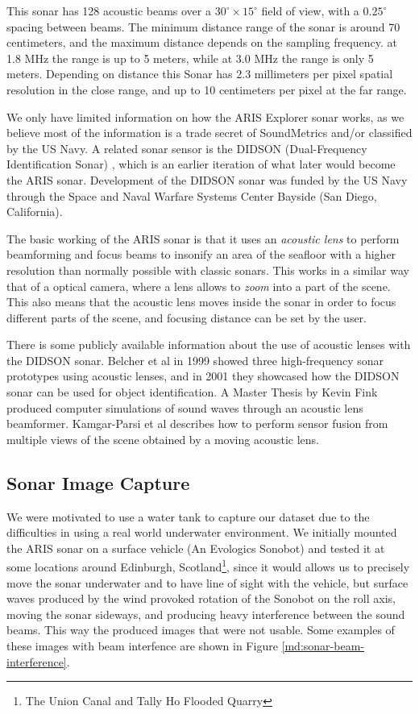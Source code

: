 This sonar has 128 acoustic beams over a $30^\circ \times 15^\circ$ field of view, with a $0.25^\circ$ spacing between beams. The minimum distance range of the sonar is around 70 centimeters, and the maximum distance depends on the sampling frequency. at 1.8 MHz the range is up to 5 meters, while at 3.0 MHz the range is only 5 meters. Depending on distance this Sonar has 2.3 millimeters per pixel spatial resolution in the close range, and up to 10 centimeters per pixel at the far range.

We only have limited information on how the ARIS Explorer sonar works, as we believe most of the information is a trade secret of SoundMetrics and/or classified by the US Navy. A related sonar sensor is the DIDSON (Dual-Frequency Identification Sonar) \cite[-2em]{belcher2002dual}, which is an earlier iteration of what later would become the ARIS sonar. Development of the DIDSON sonar was funded by the US Navy through the Space and Naval Warfare Systems Center Bayside (San Diego, California).

The basic working of the ARIS sonar is that it uses an \textit{acoustic lens} \cite[-2em]{wu2010beam} to perform beamforming and focus beams to insonify an area of the seafloor with a higher resolution than normally possible with classic sonars.  This works in a similar way that of a optical camera, where a lens allows to \textit{zoom} into a part of the scene. This also means that the acoustic lens moves inside the sonar in order to focus different parts of the scene, and focusing distance can be set by the user.

There is some publicly available information about the use of acoustic lenses with the DIDSON sonar. Belcher et al in 1999 \cite[-6em]{belcher1999beamforming} showed three high-frequency sonar prototypes using acoustic lenses, and in 2001 \cite[-1em]{belcher2001object} they showcased how the DIDSON sonar can be used for object identification. A Master Thesis by Kevin Fink \cite[2em]{fink1994computer} produced computer simulations of sound waves through an acoustic lens beamformer. Kamgar-Parsi et al \cite[1em]{kamgar1998underwater} describes how to perform sensor fusion from multiple views of the scene obtained by a moving acoustic lens.

\subsection{Sonar Image Capture}

We were motivated to use a water tank to capture our dataset due to the difficulties in using a real world underwater environment. We initially mounted the ARIS sonar on a surface vehicle (An Evologics Sonobot) and tested it at some locations around Edinburgh, Scotland\footnote{The Union Canal and Tally Ho Flooded Quarry}, since it would allows us to precisely move the sonar underwater and to have line of sight with the vehicle, but surface waves produced by the wind provoked rotation of the Sonobot on the roll axis, moving the sonar sideways, and producing heavy interference between the sound beams. This way the produced images that were not usable. Some examples of these images with beam interfence are shown in Figure \ref{md:sonar-beam-interference}.


